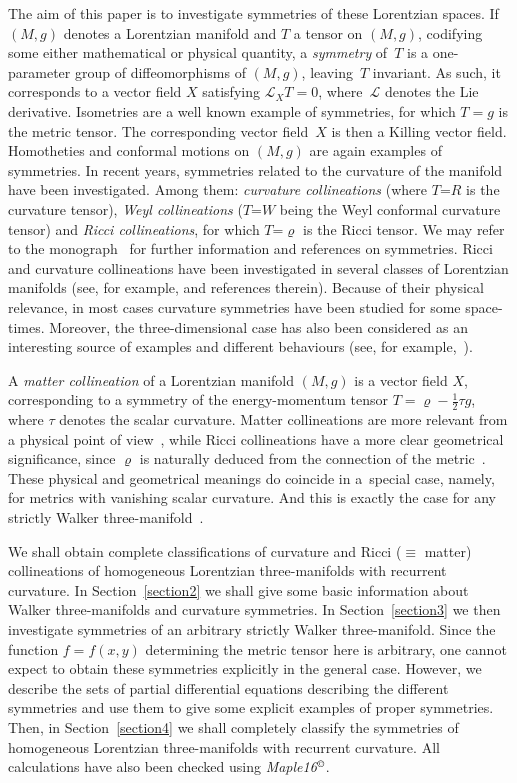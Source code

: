 \documentclass[10pt,a4paper]{amsart}
\numberwithin{equation}{section}
\begin{document}
The aim of this paper is to investigate symmetries of these Lorentzian spaces. If $(M,g)$ denotes a Lorentzian manifold and $T$ a tensor on $(M,g)$, codifying some either mathematical or physical quantity, a {\em symmetry} of~$T$ is a one-parameter group of dif\/feomorphisms of $(M,g)$, leaving~$T$ invariant. As such, it corresponds to a vector f\/ield $X$ satisfying $\mathcal L_X T=0$, where~$\mathcal L$ denotes the Lie derivative. Isometries are a well known example of symmetries, for which $T=g$ is the metric tensor. The corresponding vector f\/ield~$X$ is then a Killing vector f\/ield. Homotheties and conformal motions on $(M,g)$ are again examples of symmetries. In recent years, symmetries related to the curvature of the manifold have been investigated. Among them: {\em curvature collineations} (where $T$=$R$ is the curvature tensor), {\em Weyl collineations} ($T$=$W$ being the Weyl conformal curvature tensor) and {\em Ricci collineations}, for which $T$=$\varrho$ is the Ricci tensor. We may refer to the monograph~\cite{Hall} for further information and references on symmetries. Ricci {and curvature} collineations have been investigated in several classes of Lorentzian manifolds (see, for example, \cite{Heic,CZ1,CZ2,CSVV,CHK,FPP,Ha,HC,HLP,HRV,KR,L,TA} and references therein). Because of their physical relevance, in most cases curvature symmetries have been studied for some space-times. Moreover, the three-dimensional case has also been considered as an interesting source of examples and dif\/ferent behaviours (see, for example,~\cite{CSVV}).

A {\em matter collineation} of a Lorentzian manifold $(M,g)$ is a vector f\/ield $X$, corresponding to a symmetry of the energy-momentum tensor $T = \varrho- \frac{1}{2}\tau g$, where $\tau$ denotes the scalar curvature. Matter collineations are more relevant from a physical point of view~\cite{CS,CCV}, while Ricci collineations have a more clear geometrical signif\/icance, since $\varrho$ is naturally deduced from the connection of the metric~\cite{HRV}. These physical and geometrical meanings do coincide in a~special case, namely, for metrics with vanishing scalar curvature. And this is exactly the case for any strictly Walker three-manifold~\cite{ChGRVA}.

We shall obtain complete classif\/ications of curvature and Ricci ($\equiv$ matter) collineations of homogeneous Lorentzian three-manifolds with recurrent curvature. In Section~\ref{section2} we shall give some basic information about Walker three-manifolds and curvature symmetries. In Section~\ref{section3} we then investigate symmetries of an arbitrary strictly Walker three-manifold. Since the function $f=f(x,y)$ determining the metric tensor here is arbitrary, one cannot expect to obtain these symmetries explicitly in the general case. However, we describe the sets of partial dif\/ferential equations describing the dif\/ferent symmetries and use them to give some explicit examples of proper symmetries. Then, in Section~\ref{section4} we shall completely classify the symmetries of homogeneous Lorentzian three-manifolds with recurrent curvature.
All calculations have also been checked using {\em Maple16$^\copyright$}.
\end{document}
